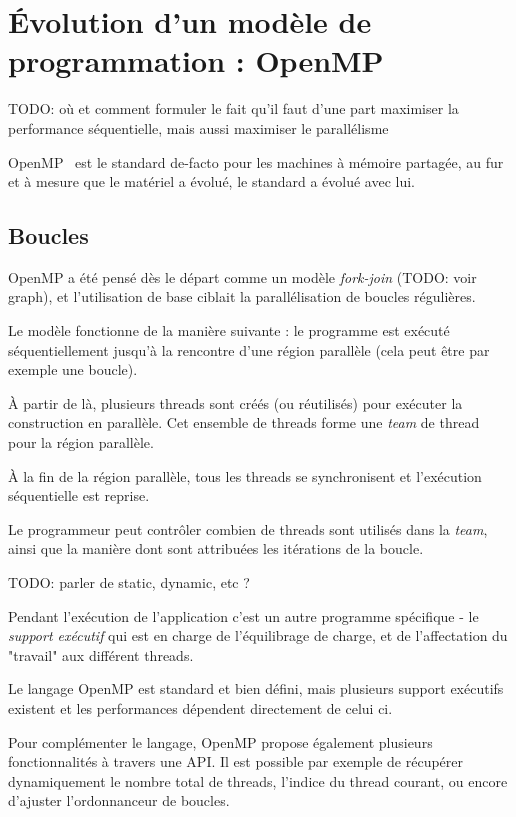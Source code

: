 \section{Évolution d'un modèle de programmation : OpenMP}\label{sec:context:openmp}

TODO: où et comment formuler le fait qu'il faut d'une part maximiser la performance séquentielle, mais aussi maximiser le parallélisme

OpenMP~\cite{openmp45} est le standard de-facto pour les machines à mémoire partagée, au fur et à mesure que le matériel a évolué, le standard a évolué avec lui.

\subsection{Boucles}

OpenMP a été pensé dès le départ comme un modèle \emph{fork-join} (TODO: voir graph), et l'utilisation de base ciblait la parallélisation de boucles régulières.

Le modèle fonctionne de la manière suivante : le programme est exécuté séquentiellement jusqu'à la rencontre d'une région parallèle (cela peut être par exemple une boucle).

À partir de là, plusieurs threads sont créés (ou réutilisés) pour exécuter la construction en parallèle. Cet ensemble de threads forme une \emph{team} de thread pour la région parallèle.

À la fin de la région parallèle, tous les threads se synchronisent et l'exécution séquentielle est reprise.

Le programmeur peut contrôler combien de threads sont utilisés dans la \emph{team}, ainsi que la manière dont sont attribuées les itérations de la boucle.

TODO: parler de static, dynamic, etc ?

Pendant l'exécution de l'application c'est un autre programme spécifique - le \emph{support exécutif} qui est en charge de l'équilibrage de charge, et de l'affectation du "travail" aux différent threads.

Le langage OpenMP est standard et bien défini, mais plusieurs support exécutifs existent et les performances dépendent directement de celui ci.

Pour complémenter le langage, OpenMP propose également plusieurs fonctionnalités à travers une API. Il est possible par exemple de récupérer dynamiquement le nombre total de threads, l'indice du thread courant, ou encore d'ajuster l'ordonnanceur de boucles.

